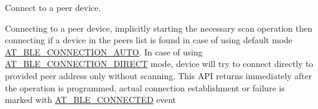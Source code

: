 Connect to a peer device. 

Connecting to a peer device, implicitly starting the necessary scan operation then connecting if a device in the peers list is found in case of using default mode \mbox{\hyperlink{at__ble__api_8h_a53f9993d9d4520af74f601a867e1d379a98150c41a7e15b8a8bf97eee18ed9d9e}{A\+T\+\_\+\+B\+L\+E\+\_\+\+C\+O\+N\+N\+E\+C\+T\+I\+O\+N\+\_\+\+A\+U\+TO}}. In case of using \mbox{\hyperlink{at__ble__api_8h_a53f9993d9d4520af74f601a867e1d379a43c036d56abb3965ae9f19020f45c335}{A\+T\+\_\+\+B\+L\+E\+\_\+\+C\+O\+N\+N\+E\+C\+T\+I\+O\+N\+\_\+\+D\+I\+R\+E\+CT}} mode, device will try to connect directly to provided peer address only without scanning. This A\+PI returns immediately after the operation is programmed, actual connection establishment or failure is marked with \mbox{\hyperlink{at__ble__api_8h_a3324640b95f33169515f89738ed5baebaae3a144ac3c727e9437afd84824e3952}{A\+T\+\_\+\+B\+L\+E\+\_\+\+C\+O\+N\+N\+E\+C\+T\+ED}} event


